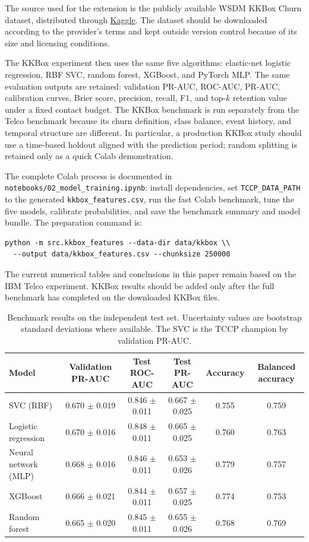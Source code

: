 \documentclass[9pt]{article}
\begin{document}
The source used for the extension is the publicly available WSDM KKBox Churn dataset, distributed through \href{https://www.kaggle.com/datasets/qmdo97/kkboxadatas}{Kaggle}. The dataset should be downloaded according to the provider's terms and kept outside version control because of its size and licensing conditions.

The KKBox experiment then uses the same five algorithms: elastic-net logistic regression, RBF SVC, random forest, XGBoost, and PyTorch MLP. The same evaluation outputs are retained: validation PR-AUC, ROC-AUC, PR-AUC, calibration curves, Brier score, precision, recall, F1, and top-$k$ retention value under a fixed contact budget. The KKBox benchmark is run separately from the Telco benchmark because its churn definition, class balance, event history, and temporal structure are different. In particular, a production KKBox study should use a time-based holdout aligned with the prediction period; random splitting is retained only as a quick Colab demonstration.

The complete Colab process is documented in \texttt{notebooks/02\_model\_training.ipynb}: install dependencies, set \texttt{TCCP\_DATA\_PATH} to the generated \texttt{kkbox\_features.csv}, run the fast Colab benchmark, tune the five models, calibrate probabilities, and save the benchmark summary and model bundle. The preparation command is:

\begin{verbatim}
python -m src.kkbox_features --data-dir data/kkbox \\
  --output data/kkbox_features.csv --chunksize 250000
\end{verbatim}

The current numerical tables and conclusions in this paper remain based on the IBM Telco experiment. KKBox results should be added only after the full benchmark has completed on the downloaded KKBox files.

\begin{table}[!ht]
\centering\scriptsize
\begin{tabular}{lccccc}
\toprule
\textbf{Model} & \textbf{Validation PR-AUC} & \textbf{Test ROC-AUC} & \textbf{Test PR-AUC} & \textbf{Accuracy} & \textbf{Balanced accuracy}\\
\midrule
SVC (RBF) & 0.670 $\pm$ 0.019 & 0.846 $\pm$ 0.011 & 0.667 $\pm$ 0.025 & 0.755 & 0.759\\
Logistic regression & 0.670 $\pm$ 0.016 & 0.848 $\pm$ 0.011 & 0.665 $\pm$ 0.025 & 0.760 & 0.763\\
Neural network (MLP) & 0.668 $\pm$ 0.016 & 0.846 $\pm$ 0.011 & 0.653 $\pm$ 0.026 & 0.779 & 0.757\\
XGBoost & 0.666 $\pm$ 0.021 & 0.844 $\pm$ 0.011 & 0.657 $\pm$ 0.025 & 0.774 & 0.753\\
Random forest & 0.665 $\pm$ 0.020 & 0.845 $\pm$ 0.011 & 0.655 $\pm$ 0.026 & 0.768 & 0.769\\
\bottomrule
\end{tabular}
\caption{Benchmark results on the independent test set. Uncertainty values are bootstrap standard deviations where available. The SVC is the TCCP champion by validation PR-AUC.}
\label{tab:benchmark}
\end{table}
\end{document}
